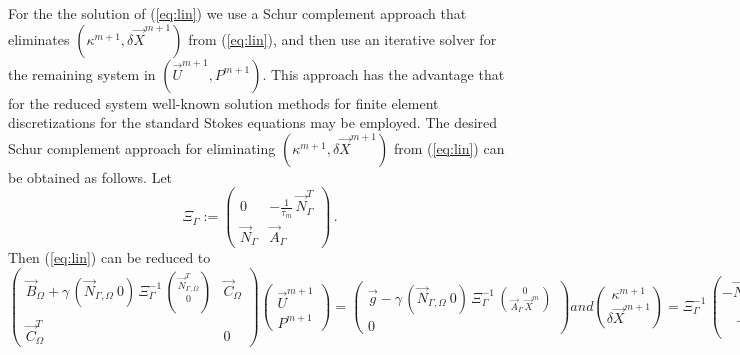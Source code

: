 \documentclass[a4paper,12pt,onecolumn]{article}
\newcommand{\NbulkT}{\vec{N}_{\Gamma,\Omega}^T}
\newcommand{\Nbulk}{\vec{N}_{\Gamma,\Omega}}
\begin{document}
For the the solution of (\ref{eq:lin}) we use a Schur complement approach that
eliminates $(\kappa^{m+1}, \delta \vec X^{m+1})$ from (\ref{eq:lin}), and then
use an iterative solver for the remaining system in $(\vec U^{m+1}, P^{m+1})$.
This approach has the advantage that for the reduced system well-known solution
methods for finite element discretizations for the standard Stokes equations may
be employed. The desired Schur complement approach for eliminating
$(\kappa^{m+1},\delta \vec X^{m+1})$ from (\ref{eq:lin}) can be obtained as
follows. Let
\begin{equation} \label{eq:Xi}
\Xi_\Gamma:= \begin{pmatrix}
 0 & - \frac1{\tau_m}\,\vec{N}_\Gamma^T \\
\vec{N}_\Gamma & \vec{A}_\Gamma
\end{pmatrix} \,.
\end{equation}
Then (\ref{eq:lin}) can be reduced to
\begin{subequations}
\begin{equation} \label{eq:SchurkX}
\begin{pmatrix}
\vec B_\Omega + \gamma\,(\Nbulk \ 0)\,\Xi_\Gamma^{-1}\,
\binom{\NbulkT}{0} & \vec C_\Omega \\
\vec C_\Omega^T & 0
\end{pmatrix}
\begin{pmatrix}
\vec U^{m+1} \\ P^{m+1}
\end{pmatrix}
= \begin{pmatrix}
\vec g
-\gamma\,(\Nbulk \ 0)\, \Xi_\Gamma^{-1}\,
\binom{0}{\vec{A}_\Gamma\,\vec{X}^{m}} \\
0
\end{pmatrix}
\end{equation}
and
\begin{equation}
\binom{\kappa^{m+1}}{\delta\vec{X}^{m+1}} = \Xi_\Gamma^{-1}\,
\binom{-\NbulkT\,\vec U^{m+1}}{-\vec{A}_\Gamma\,\vec{X}^{m}}\,.
\label{eq:SchurkXb}
\end{equation}
\end{subequations}
\end{document}
